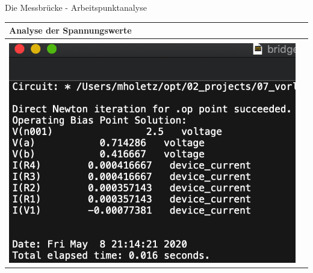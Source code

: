      \begin{frame}[t]{Die Messbrücke - Arbeitspunktanalyse} 
    
      \begin{spacing}{0.9} \begin{tiny}
      \begin{table}[h!]
        \begin{tabular}{p{3cm} p{7cm}}
         \hline
         \textbf{Analyse der Spannungswerte} & \\
         \hline \\
         \begin{minipage}{.3\textwidth}
          \includegraphics[width=\linewidth]{pictures/log_1.png}
        \end{minipage} 
        & 
        \begin{minipage}{.7\textwidth}
        

\end{minipage}
\end{tabular}
\end{table}
\end{tiny}
\end{spacing}
\end{frame}
